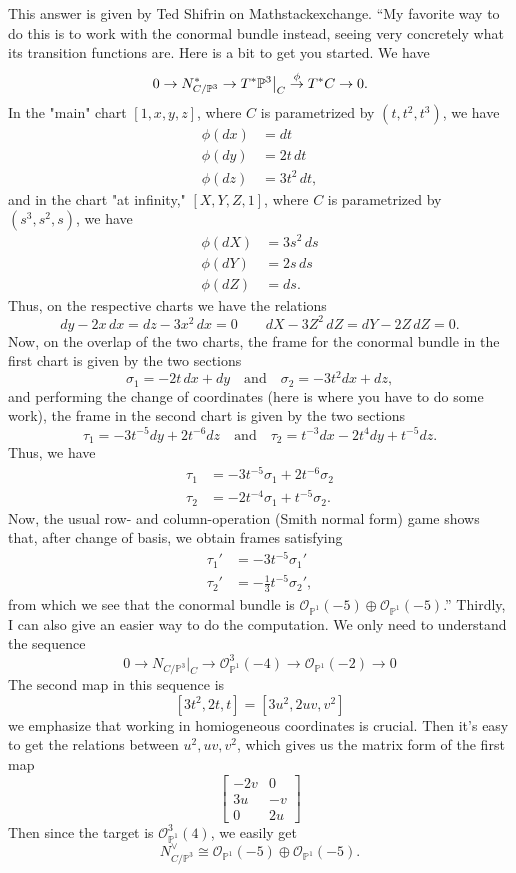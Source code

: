 \documentclass[../main.tex]{subfiles}
\begin{document}
\begin{example}
This answer is given by Ted Shifrin on Mathstackexchange.
``My favorite way to do this is to work with the conormal bundle instead, seeing very concretely what its transition functions are. Here is a bit to get you started. We have
$$0\to N^*_{C/\Bbb P^3}\to T^*\Bbb P^3\big|_C \overset{\phi}\to T^*C \to 0.$$
In the "main" chart $[1,x,y,z]$, where $C$ is parametrized by $(t,t^2,t^3)$, we have 
\begin{align*}\phi(dx)&=dt \\ \phi(dy)&=2t\,dt \\ \phi(dz)&=3t^2\,dt, \end{align*}
and in the chart "at infinity," $[X,Y,Z,1]$, where $C$ is parametrized by $(s^3,s^2,s)$, we have
\begin{align*} \phi(dX)&=3s^2\,ds \\ \phi(dY)&=2s\,ds \\ \phi(dZ)&=ds. \end{align*}
Thus, on the respective charts we have the relations 
$$dy-2x\,dx = dz-3x^2\,dx = 0 \qquad dX -3Z^2\,dZ = dY - 2Z\,dZ = 0.$$
Now, on the overlap of the two charts, the frame for the conormal bundle in the first chart is given by the two sections $$\sigma_1=-2t\,dx + dy \quad\text{and}\quad \sigma_2=-3t^2dx + dz,$$ and performing the change of coordinates (here is where you have to do some work), the frame in the second chart is given by the two sections $$\tau_1 = -3t^{-5}dy + 2t^{-6}dz \quad\text{and}\quad \tau_2=t^{-3}dx-2t^4dy+t^{-5}dz.$$
Thus, we have
\begin{align*} \tau_1 &= -3t^{-5}\sigma_1+2t^{-6}\sigma_2 \\ \tau_2 &=-2t^{-4}\sigma_1+t^{-5}\sigma_2.\end{align*}
Now, the usual row- and column-operation (Smith normal form) game shows that, after change of basis, we obtain frames satisfying
\begin{align*} \tau_1' &= -3t^{-5}\sigma_1' \\ \tau_2' &= -\frac13t^{-5}\sigma_2',\end{align*}
from which we see that the conormal bundle is $\mathcal{O}_{\mathbb{P}^{1}}(-5)\oplus \mathcal{O}_{\mathbb{P}^{1}}(-5)$.'' 
Thirdly, I can also give an easier way to do the computation. We only need to understand the sequence 
$$0\rightarrow N_{C/\mathbb{P}^{3}}|_{C}\rightarrow \mathcal{O}_{\mathbb{P}^{1}}^{3}(-4)\rightarrow \mathcal{O}_{\mathbb{P}^{1}}(-2)\rightarrow 0$$
The second map in this sequence is 
$$[3t^{2},2t,t]=[3u^{2},2uv,v^{2}]$$
we emphasize that working in homiogeneous coordinates is crucial. Then it's easy to get the relations between $u^{2},uv, v^{2}$, which gives us the matrix form of the first map
$$\begin{bmatrix}-2v & 0\\
3u & -v\\
0 & 2u\end{bmatrix}$$
Then since the target is $\mathcal{O}_{\mathbb{P}^{1}}^{3}(4)$, we easily get 
$$N^{\vee}_{C/\mathbb{P}^{3}}\cong \mathcal{O}_{\mathbb{P}^{1}}(-5)\oplus \mathcal{O}_{\mathbb{P}^{1}}(-5).$$
\end{example}
\end{document}
